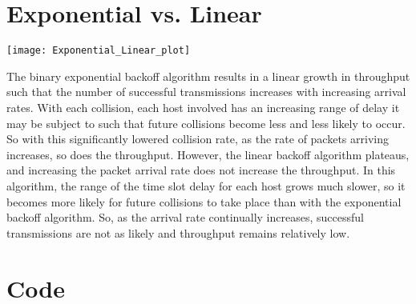 \documentclass{article}
\begin{document}
\section*{Exponential vs. Linear}
\begin{center}
\texttt{[image: Exponential\_Linear\_plot]}
\end{center}
The binary exponential backoff algorithm results in a linear growth in throughput such that the number of successful transmissions increases with increasing arrival rates. With each collision, each host involved has an increasing range of delay it may be subject to such that future collisions become less and less likely to occur. So with this significantly lowered collision rate, as the rate of packets arriving increases, so does the throughput. However, the linear backoff algorithm plateaus, and increasing the packet arrival rate does not increase the throughput. In this algorithm, the range of the time slot delay for each host grows much slower, so it becomes more likely for future collisions to take place than with the exponential backoff algorithm. So, as the arrival rate continually increases, successful transmissions are not as likely and throughput remains relatively low.

\section*{Code}

\end{document}
